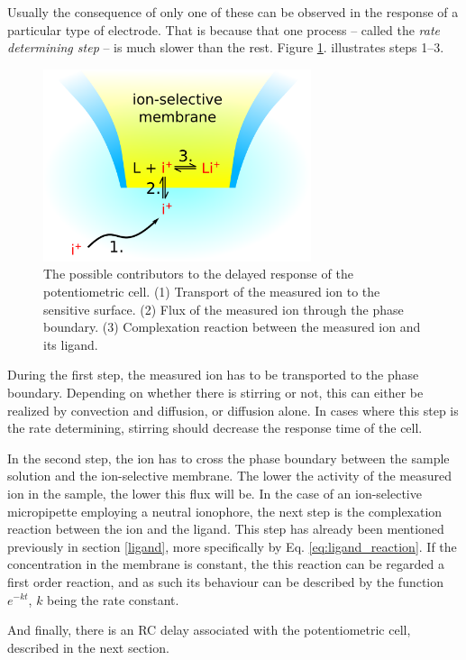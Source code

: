 Usually the consequence of only one of these can be observed in the response of a particular type of electrode. That is because that one process -- called the \emph{rate determining step} -- is much slower than the rest. Figure \ref{fig:rds}. illustrates steps 1--3.
\begin{figure}[t]
\centering
\includegraphics[width=0.7\textwidth]{img/rds.eps}
\caption[The possible contributors to the delayed response of the potentiometric cell.]{The possible contributors to the delayed response of the potentiometric cell. (1) Transport of the measured ion to the sensitive surface. (2) Flux of the measured ion through the phase boundary. (3) Complexation reaction between the measured ion and its ligand.}
\label{fig:rds}
\end{figure}
During the first step, the measured ion has to be transported to the phase boundary. Depending on whether there is stirring or not, this can either be realized by convection and diffusion, or diffusion alone. In cases where this step is the rate determining, stirring should decrease the response time of the cell.

In the second step, the ion has to cross the phase boundary between the sample solution and the ion-selective membrane. The lower the activity of the measured ion in the sample, the lower this flux will be. In the case of an ion-selective micropipette employing a neutral ionophore, the next step is the complexation reaction between the ion and the ligand. This step has already been mentioned previously in section \ref{ligand}, more specifically by Eq. \ref{eq:ligand_reaction}. If the concentration in the membrane is constant, the this reaction can be regarded a first order reaction, and as such its behaviour can be described by the function $e^{-kt}$, $k$ being the rate constant.

And finally, there is an RC delay associated with the potentiometric cell, described in the next section.

